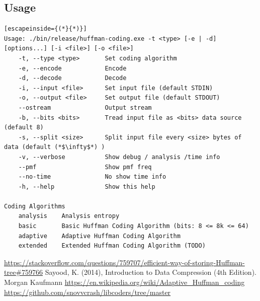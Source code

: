 \documentclass[a4paper,conference]{IEEEtran}
\begin{document}
\subsection{Usage}

\begin{lstlisting}[escapeinside={(*}{*)}]
Usage: ./bin/release/huffman-coding.exe -t <type> [-e | -d] [options...] [-i <file>] [-o <file>]
    -t, --type <type>       Set coding algorithm
    -e, --encode            Encode
    -d, --decode            Decode
    -i, --input <file>      Set input file (default STDIN)
    -o, --output <file>     Set output file (default STDOUT)
    --ostream               Output stream
    -b, --bits <bits>       Tread input file as <bits> data source (default 8)
    -s, --split <size>      Split input file every <size> bytes of data (default (*$\infty$*) )
    -v, --verbose           Show debug / analysis /time info
    --pmf                   Show pmf freq
    --no-time               No show time info
    -h, --help              Show this help

Coding Algorithms
    analysis    Analysis entropy
    basic       Basic Huffman Coding Algorithm (bits: 8 <= 8k <= 64)
    adaptive    Adaptive Huffman Coding Algorithm
    extended    Extended Huffman Coding Algorithm (TODO)
\end{lstlisting}

\begin{thebibliography}{00}
 \url{https://stackoverflow.com/questions/759707/efficient-way-of-storing-Huffman-tree\#759766}
 Sayood, K. (2014), Introduction to Data Compression (4th Edition). Morgan Kaufmann
 \url{https://en.wikipedia.org/wiki/Adaptive_Huffman_coding}
 \url{https://github.com/snovvcrash/libcoders/tree/master}
\end{thebibliography}
\end{document}
